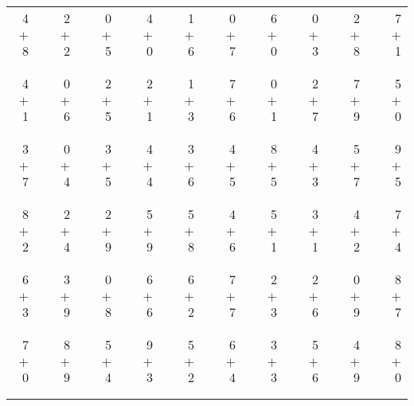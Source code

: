 \documentclass[12pt, letterpaper]{article}
\begin{document}
\begin{tabular}{rrrrrrrrrrrrrrrrrrr}
4 & & 2 & & 0 & & 4 & & 1 & & 0 & & 6 & & 0 & & 2 & & 7\\
$+$ 8 & & $+$ 2 & & $+$ 5 & & $+$ 0 & & $+$ 6 & & $+$ 7 & & $+$ 0 & & $+$ 3 & & $+$ 8 & & $+$ 1\\
\cline{1-1} \cline{3-3} \cline{5-5} \cline{7-7} \cline{9-9} \cline{11-11} \cline{13-13} \cline{15-15} \cline{17-17} \cline{19-19} \\ \\
4 & & 0 & & 2 & & 2 & & 1 & & 7 & & 0 & & 2 & & 7 & & 5\\
$+$ 1 & & $+$ 6 & & $+$ 5 & & $+$ 1 & & $+$ 3 & & $+$ 6 & & $+$ 1 & & $+$ 7 & & $+$ 9 & & $+$ 0\\
\cline{1-1} \cline{3-3} \cline{5-5} \cline{7-7} \cline{9-9} \cline{11-11} \cline{13-13} \cline{15-15} \cline{17-17} \cline{19-19} \\ \\
3 & & 0 & & 3 & & 4 & & 3 & & 4 & & 8 & & 4 & & 5 & & 9\\
$+$ 7 & & $+$ 4 & & $+$ 5 & & $+$ 4 & & $+$ 6 & & $+$ 5 & & $+$ 5 & & $+$ 3 & & $+$ 7 & & $+$ 5\\
\cline{1-1} \cline{3-3} \cline{5-5} \cline{7-7} \cline{9-9} \cline{11-11} \cline{13-13} \cline{15-15} \cline{17-17} \cline{19-19} \\ \\
8 & & 2 & & 2 & & 5 & & 5 & & 4 & & 5 & & 3 & & 4 & & 7\\
$+$ 2 & & $+$ 4 & & $+$ 9 & & $+$ 9 & & $+$ 8 & & $+$ 6 & & $+$ 1 & & $+$ 1 & & $+$ 2 & & $+$ 4\\
\cline{1-1} \cline{3-3} \cline{5-5} \cline{7-7} \cline{9-9} \cline{11-11} \cline{13-13} \cline{15-15} \cline{17-17} \cline{19-19} \\ \\
6 & & 3 & & 0 & & 6 & & 6 & & 7 & & 2 & & 2 & & 0 & & 8\\
$+$ 3 & & $+$ 9 & & $+$ 8 & & $+$ 6 & & $+$ 2 & & $+$ 7 & & $+$ 3 & & $+$ 6 & & $+$ 9 & & $+$ 7\\
\cline{1-1} \cline{3-3} \cline{5-5} \cline{7-7} \cline{9-9} \cline{11-11} \cline{13-13} \cline{15-15} \cline{17-17} \cline{19-19} \\ \\
7 & & 8 & & 5 & & 9 & & 5 & & 6 & & 3 & & 5 & & 4 & & 8\\
$+$ 0 & & $+$ 9 & & $+$ 4 & & $+$ 3 & & $+$ 2 & & $+$ 4 & & $+$ 3 & & $+$ 6 & & $+$ 9 & & $+$ 0\\
\cline{1-1} \cline{3-3} \cline{5-5} \cline{7-7} \cline{9-9} \cline{11-11} \cline{13-13} \cline{15-15} \cline{17-17} \cline{19-19} \\ \\

\end{tabular}
\end{document}
